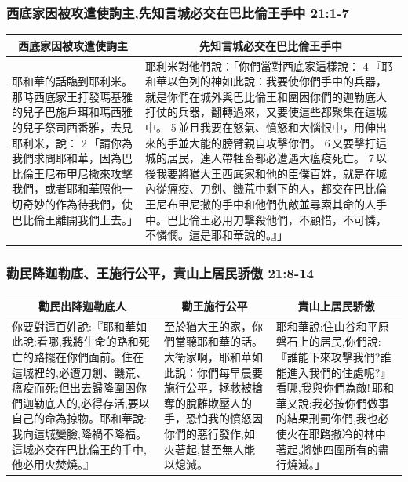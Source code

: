 \subsubsection{西底家因被攻遣使詢主,先知言城必交在巴比倫王手中 21:1-7}
\begin{table}[H]
\centering
\begin{tabular}{p{5.25cm}|p{11.250cm}}\hline\hline
\multicolumn{1}{c|}{西底家因被攻遣使詢主}&\multicolumn{1}{c}{先知言城必交在巴比倫王手中}\\\hline
耶和華的話臨到耶利米。那時西底家王打發瑪基雅的兒子巴施戶珥和瑪西雅的兒子祭司西番雅，去見耶利米，說： 2 「請你為我們求問耶和華，因為巴比倫王尼布甲尼撒來攻擊我們，或者耶和華照他一切奇妙的作為待我們，使巴比倫王離開我們上去。」
&耶利米對他們說：「你們當對西底家這樣說： 4 『耶和華以色列的神如此說：我要使你們手中的兵器，就是你們在城外與巴比倫王和圍困你們的迦勒底人打仗的兵器，翻轉過來，又要使這些都聚集在這城中。 5 並且我要在怒氣、憤怒和大惱恨中，用伸出來的手並大能的膀臂親自攻擊你們。 6 又要擊打這城的居民，連人帶牲畜都必遭遇大瘟疫死亡。 7 以後我要將猶大王西底家和他的臣僕百姓，就是在城內從瘟疫、刀劍、饑荒中剩下的人，都交在巴比倫王尼布甲尼撒的手中和他們仇敵並尋索其命的人手中。巴比倫王必用刀擊殺他們，不顧惜，不可憐，不憐憫。這是耶和華說的。』」\\\hline
\end{tabular}
\end{table}

\subsubsection{勸民降迦勒底、王施行公平，責山上居民骄傲 21:8-14}
\begin{table}[H]
\centering
\begin{tabular}{p{6.5cm}|p{4.25cm}|p{5.25cm}}\hline\hline
\multicolumn{1}{c|}{勸民出降迦勒底人}&\multicolumn{1}{c|}{勸王施行公平}&\multicolumn{1}{c}{責山上居民骄傲}\\\hline
你要對這百姓說:『耶和華如此說:看哪,我將生命的路和死亡的路擺在你們面前。住在這城裡的,必遭刀劍、饑荒、瘟疫而死;但出去歸降圍困你們迦勒底人的,必得存活,要以自己的命為掠物。耶和華說:我向這城變臉,降禍不降福。這城必交在巴比倫王的手中,他必用火焚燒。』
&至於猶大王的家，你們當聽耶和華的話。大衛家啊，耶和華如此說：你們每早晨要施行公平，拯救被搶奪的脫離欺壓人的手，恐怕我的憤怒因你們的惡行發作,如火著起,甚至無人能以熄滅。
&耶和華說:住山谷和平原磐石上的居民,你們說:『誰能下來攻擊我們?誰能進入我們的住處呢?』看哪,我與你們為敵! 耶和華又說:我必按你們做事的結果刑罰你們,我也必使火在耶路撒冷的林中著起,將她四圍所有的盡行燒滅。」\\\hline
\end{tabular}
\end{table}


